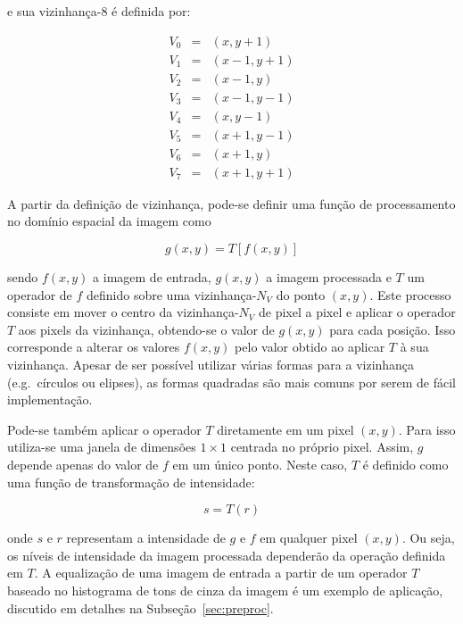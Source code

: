 \noindent e sua vizinhança-8 é definida por:

\begin{eqnarray}
  V_0 & = & (x, y+1) \\
  V_1 & = & (x-1, y+1) \\
  V_2 & = & (x-1, y) \\
  V_3 & = & (x-1, y-1) \\
  V_4 & = & (x, y-1) \\
  V_5 & = & (x+1, y-1) \\
  V_6 & = & (x+1, y) \\
  V_7 & = & (x+1, y+1)
\end{eqnarray}

A partir da definição de vizinhança, pode-se definir uma função de
processamento no domínio espacial da imagem como

\begin{equation}
  g(x,y) = T[f(x,y)]
  \label{eq:fproc}
\end{equation}

\noindent sendo $f(x,y)$ a imagem de entrada, $g(x,y)$ a imagem
processada e $T$ um operador de $f$ definido sobre uma
vizinhança-$N_V$ do ponto $(x,y)$. Este processo consiste em mover o
centro da vizinhança-$N_V$ de pixel a pixel e aplicar o operador $T$
aos pixels da vizinhança, obtendo-se o valor de $g(x,y)$ para cada
posição. Isso corresponde a alterar os valores $f(x,y)$ pelo valor
obtido ao aplicar $T$ à sua vizinhança. Apesar de ser possível
utilizar várias formas para a vizinhança (e.g.\ círculos ou elipses),
as formas quadradas são mais comuns por serem de fácil
implementação.~\cite{gonzalez}

Pode-se também aplicar o operador $T$ diretamente em um pixel
$(x,y)$. Para isso utiliza-se uma janela de dimensões $1 \times 1$
centrada no próprio pixel. Assim, $g$ depende apenas do valor de $f$
em um único ponto. Neste caso, $T$ é definido como uma função de
transformação de intensidade:

\begin{equation}
  s = T(r)
\end{equation} 

\noindent onde $s$ e $r$ representam a intensidade de $g$ e $f$ em qualquer pixel $(x,y)$. 
Ou seja, os níveis de intensidade da imagem processada dependerão da
operação definida em $T$. A equalização de uma imagem de entrada a
partir de um operador $T$ baseado no histograma de tons de cinza da
imagem é um exemplo de aplicação, discutido em detalhes na
Subseção~\ref{sec:preproc}.

